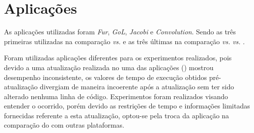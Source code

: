 \section{Aplicações}
\label{sec:aplicacoes}

As aplicações utilizadas foram \textit{Fur}, \textit{GoL}, \textit{Jacobi} e \textit{Convolution}. Sendo as três primeiras utilizadas na comparação \async \textit{vs.} \ipc e as três últimas na comparação \async \textit{vs.} \gpu \textit{vs.} \cpu. 

Foram utilizadas aplicações diferentes para os experimentos realizados, pois devido a uma atualização realizada no \mppa uma das aplicações (\fur) mostrou desempenho inconsistente, os valores de tempo de execução obtidos pré-atualização divergiam de maneira incoerente após a atualização sem ter sido alterado nenhuma linha de código. Experimentos foram realizados visando entender o ocorrido, porém devido as restrições de tempo e informações limitadas fornecidas referente a esta atualização, optou-se pela troca da aplicação na comparação do \mppa com outras plataformas.

